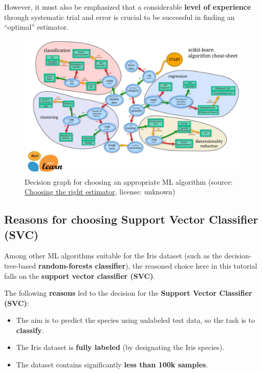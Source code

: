 \documentclass [oneside,10pt,a4paper,ngerman,BCOR10mm,headsepline,parindent,final]{scrartcl}
\providecommand{\tightlist}{%
      \setlength{\itemsep}{0pt}\setlength{\parskip}{0pt}}
\begin{document}
However, it must also be emphasized that a considerable \textbf{level of
experience} through systematic trial and error is crucial to be
successful in finding an ``optimal'' estimator.

    \begin{figure}
\centering
\includegraphics{images/scikit-learn_ml_algorithm_decision.png}
\caption{Decision graph for choosing an appropriate ML algorithm
(source:
\href{https://scikit-learn.org/stable/tutorial/machine_learning_map/index.html}{Choosing
the right estimator}, license: unknown)}
\end{figure}

    \hypertarget{reasons-for-choosing-support-vector-classifier-svc}{%
\subsection{Reasons for choosing Support Vector Classifier
(SVC)}\label{reasons-for-choosing-support-vector-classifier-svc}}

Among other ML algorithms suitable for the Iris dataset (such as the
decision-tree-based \textbf{random-forests classifier}), the reasoned
choice here in this tutorial falls on the \textbf{support vector
classifier (SVC)}.

The following \textbf{reasons} led to the decision for the
\textbf{Support Vector Classifier (SVC)}:

\begin{itemize}
\tightlist
\item
  The aim is to predict the species using unlabeled test data, so the
  task is to \textbf{classify}.
\item
  The Iris dataset is \textbf{fully labeled} (by designating the Iris
  species).
\item
  The dataset contains significantly \textbf{less than 100k samples}.
\end{itemize}
\end{document}
